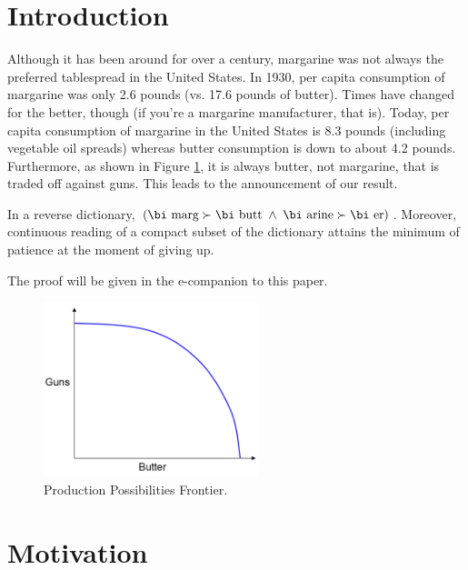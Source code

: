 \documentclass[mnsc,blindrev]{informs3} %
\begin{document}

\section{Introduction}

Although it has been around for over a century, margarine was not
always the preferred tablespread in the United States. In 1930, per
capita consumption of margarine was only 2.6 pounds (vs. 17.6 pounds
of butter). Times have changed for the better, though (if you're a
margarine manufacturer, that is). Today, per capita consumption of
margarine in the United States is 8.3 pounds (including vegetable
oil spreads) whereas butter consumption is down to about 4.2 pounds.
Furthermore, as shown in Figure \ref{frontier}, it is always butter,
not margarine, that is traded off against guns. This leads to the announcement of our  result.

\begin{theorem}
\label{marg-butt-th}
In a reverse dictionary, $(\mbox{\bi marg}\succ\mbox{\bi butt\/}\; \land\;  
\mbox{\bi arine}\succ\mbox{\bi er})$.
Moreover, continuous reading of a compact subset of the dictionary
attains the minimum of patience at the moment of giving up.
\end{theorem}

The proof will be given in the e-companion to this paper.



\begin{figure}[t]
\begin{center}
\includegraphics[height=2in]{Sample-Figure.pdf}
\caption{Production Possibilities Frontier.} \label{frontier}
\end{center}
\end{figure}

\section{Motivation}
\end{document}
